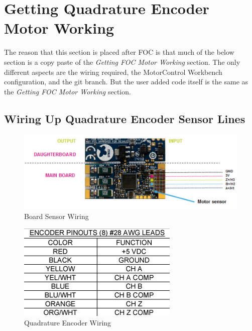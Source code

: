 \documentclass[10pt]{article}
\begin{document}
	\FloatBarrier \section{Getting Quadrature Encoder Motor Working}
        The reason that this section is placed after FOC is that much of the below section is a copy paste of the \emph{Getting FOC Motor Working} section. The only different aspects are the wiring required, the MotorControl Workbench configuration, and the git branch. But the user added code itself is the same as the \emph{Getting FOC Motor Working} section.
		\FloatBarrier \subsection{Wiring Up Quadrature Encoder Sensor Lines}
            \begin{figure}[H]
                \centerline{\includegraphics[width=\textwidth]{References/Sensor Wiring.png}}
                \caption{Board Sensor Wiring}
            \end{figure}
            \begin{figure}[H]
                \centerline{\includegraphics[width=\textwidth]{References/QEI Wiring.png}}
                \caption{Quadrature Encoder Wiring}
            \end{figure}
\end{document}
